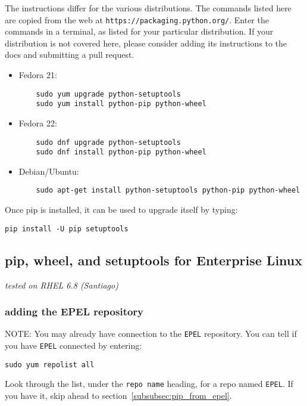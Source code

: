 The instructions differ for the various distributions.
The commands listed here are copied 
from the web at \verb|https://packaging.python.org/|.
Enter the commands in a terminal, 
as listed for your particular distribution.
If your distribution is not covered here, 
please consider adding its instructions to the docs
and submitting a pull request.

\begin{itemize}
\item Fedora 21: 
    \begin{lstlisting}
    sudo yum upgrade python-setuptools
    sudo yum install python-pip python-wheel
    \end{lstlisting}
\item Fedora 22: 
    \begin{lstlisting}
    sudo dnf upgrade python-setuptools
    sudo dnf install python-pip python-wheel
    \end{lstlisting}
\item Debian/Ubuntu: 
    \begin{lstlisting}
    sudo apt-get install python-setuptools python-pip python-wheel
    \end{lstlisting}
\end{itemize}

Once pip is installed, it can be used to upgrade itself by typing:
\begin{lstlisting}
pip install -U pip setuptools
\end{lstlisting}

\subsection{pip, wheel, and setuptools for Enterprise Linux}
\label{subsec:setup_rhel}

\textit{tested on RHEL 6.8 (Santiago)}

\subsubsection{adding the EPEL repository}

NOTE: You may already have connection to the \verb|EPEL| repository.
You can tell if you have \verb|EPEL| connected by entering:
\begin{lstlisting}
sudo yum repolist all
\end{lstlisting}
Look through the list, 
under the \verb|repo name| heading,
for a repo named \verb|EPEL|.
If you have it, skip ahead to section~\ref{subsubsec:pip_from_epel}.

